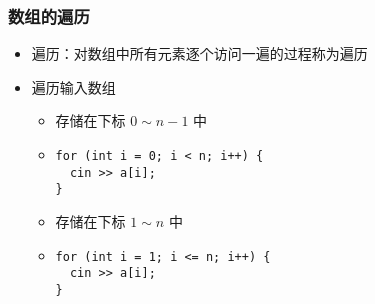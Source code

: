 
\begin{frame}[fragile]
    \frametitle{数组的遍历}

    \begin{overlayarea}{\textwidth}{.66\textheight}
        \begin{itemize}
            \item 遍历：对数组中所有元素逐个访问一遍的过程称为遍历

            \item 遍历输入数组

                \begin{itemize}
                    \item<1-> 存储在下标 $0 \sim n - 1$ 中
                    \item<1->
                        \lstinline|for (int i = 0; i < n; i++) {|\\
                        \lstinline|  cin >> a[i];|\\
                        \lstinline|}|
                    \item<2-> 存储在下标 $1 \sim n$ 中
                    \item<2->
                        \lstinline|for (int i = 1; i <= n; i++) {|\\
                        \lstinline|  cin >> a[i];|\\
                        \lstinline|}|
                \end{itemize}

        \end{itemize}
    \end{overlayarea}
\end{frame}

